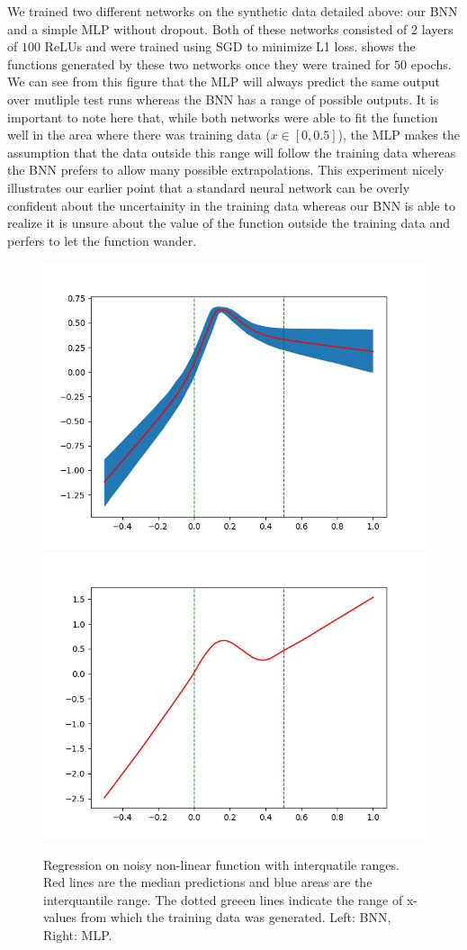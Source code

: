 \documentclass[11pt]{article}
\begin{document}
We trained two different networks on the synthetic data detailed above: our BNN
and a simple MLP without dropout. Both of these networks consisted of
2 layers of $100$ ReLUs and were trained using SGD to minimize L1 loss.
   shows the functions generated by these two networks
  once they were trained for $50$ epochs. We can see from this figure that the
  MLP will always predict the same output over mutliple test runs whereas the
  BNN has a range of possible outputs. It is important to note here that, while
  both networks were able to fit the function well in the area where there was
  training data ($x\in[0, 0.5]$), the MLP makes the assumption that the data
  outside this range will follow the training data whereas the BNN prefers to
  allow many possible extrapolations. This experiment nicely illustrates our
  earlier point that a standard neural network can be overly confident about
  the uncertainity in the training data whereas our BNN is able to realize it
  is unsure about the value of the function outside the training data and
  perfers to let the function wander.

\begin{figure}
  \centering
  \includegraphics[width=.45\textwidth]{figures/reg_bnn_extended.png}
  \includegraphics[width=.45\textwidth]{figures/reg_mlp_extended.png}
  \caption{Regression on noisy non-linear function with interquatile ranges.
  Red lines are the median predictions and blue areas are the interquantile
  range.  The dotted greeen lines indicate the range of x-values from which the
  training data was generated.  Left: BNN, Right: MLP.}\label{fig:reg_extended}
\end{figure}
\end{document}
